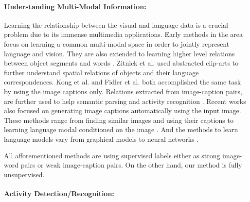 \paragraph{Understanding Multi-Modal Information:}
Learning the relationship between the visual and language data is a crucial problem due to its immense multimedia applications. Early methods \cite{matching} in the area focus on learning a common multi-modal space in order to jointly represent language and vision. They are also extended to learning higher level relations between object segments and words \cite{connecting}. Zitnick et al.\cite{zitnick2013learning,zitnick2013bringing} used abstracted clip-arts to further understand spatial relations of objects and their language correspondences. Kong et al. \cite{kong2014you} and Fidler et al. \cite{fidler2013sentence} both accomplished the same task by using the image captions only. Relations extracted from image-caption pairs, are further used to help semantic parsing \cite{yu2013grounded} and activity recognition \cite{motwani2012improving}. Recent works also focused on generating image captions automatically using the input image. These methods range from finding similar images and using their captions \cite{ordonez2011im2text} to learning language modal conditioned on the image \cite{kiros2014multimodal,socher2014grounded,farhadi2010every}. And the methods to learn language models vary from graphical models \cite{farhadi2010every} to neural networks \cite{socher2014grounded,kiros2014multimodal,deepAlignment}.

All afforementioned methods are using supervised labels either as strong image-word pairs or weak image-caption pairs. On the other hand, our method is fully unsupervised.

\paragraph{Activity Detection/Recognition:}


